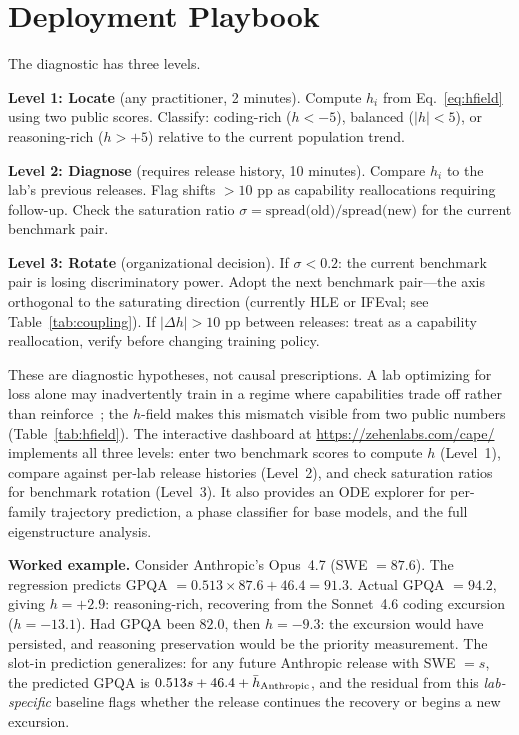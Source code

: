 \documentclass{article}
\begin{document}
\section{Deployment Playbook}
\label{sec:discussion}

The diagnostic has three levels.

\textbf{Level 1: Locate} (any practitioner, 2 minutes).
Compute $h_i$ from Eq.~\ref{eq:hfield} using two public scores.
Classify: coding-rich ($h < -5$), balanced ($|h| < 5$), or reasoning-rich ($h > +5$)
relative to the current population trend.

\textbf{Level 2: Diagnose} (requires release history, 10 minutes).
Compare $h_i$ to the lab's previous releases.
Flag shifts $> 10$ pp as capability reallocations requiring follow-up.
Check the saturation ratio $\sigma = \text{spread(old)} / \text{spread(new)}$
for the current benchmark pair.

\textbf{Level 3: Rotate} (organizational decision).
If $\sigma < 0.2$: the current benchmark pair is losing discriminatory power.
Adopt the next benchmark pair---the axis orthogonal to the saturating direction
(currently HLE or IFEval; see Table~\ref{tab:coupling}).
If $|\Delta h| > 10$ pp between releases: treat as a capability reallocation,
verify before changing training policy.

These are diagnostic hypotheses, not causal prescriptions.
A lab optimizing for loss alone may inadvertently train in a regime where
capabilities trade off rather than reinforce~\cite{amin2026lying};
the $h$-field makes this mismatch visible from two public numbers
(Table~\ref{tab:hfield}).
The interactive dashboard at \url{https://zehenlabs.com/cape/}
implements all three levels: enter two benchmark scores to compute $h$ (Level~1),
compare against per-lab release histories (Level~2),
and check saturation ratios for benchmark rotation (Level~3).
It also provides an ODE explorer for per-family trajectory prediction,
a phase classifier for base models, and the full eigenstructure analysis.

\textbf{Worked example.}
Consider Anthropic's Opus~4.7 (SWE $= 87.6$).
The regression predicts GPQA $= 0.513 \times 87.6 + 46.4 = 91.3$.
Actual GPQA $= 94.2$, giving $h = +2.9$: reasoning-rich, recovering from
the Sonnet~4.6 coding excursion ($h = -13.1$).
Had GPQA been $82.0$, then $h = -9.3$: the excursion would have persisted,
and reasoning preservation would be the priority measurement.
The slot-in prediction generalizes:
for any future Anthropic release with SWE $= s$,
the predicted GPQA is $0.513s + 46.4 + \bar{h}_{\rm Anthropic}$,
and the residual from this \emph{lab-specific} baseline flags
whether the release continues the recovery or begins a new excursion.
\end{document}

